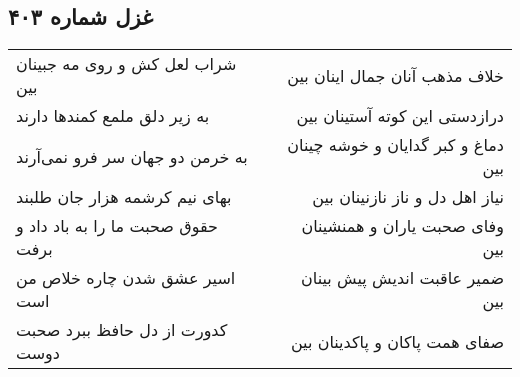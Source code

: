 \begin{center}
\section*{غزل شماره ۴۰۳}
\label{sec:sh403}
\begin{longtable}{l p{0.5cm} r}
شراب لعل کش و روی مه جبینان بین
&&
خلاف مذهب آنان جمال اینان بین
\\
به زیر دلق ملمع کمندها دارند
&&
درازدستی این کوته آستینان بین
\\
به خرمن دو جهان سر فرو نمی‌آرند
&&
دماغ و کبر گدایان و خوشه چینان بین
\\
بهای نیم کرشمه هزار جان طلبند
&&
نیاز اهل دل و ناز نازنینان بین
\\
حقوق صحبت ما را به باد داد و برفت
&&
وفای صحبت یاران و همنشینان بین
\\
اسیر عشق شدن چاره خلاص من است
&&
ضمیر عاقبت اندیش پیش بینان بین
\\
کدورت از دل حافظ ببرد صحبت دوست
&&
صفای همت پاکان و پاکدینان بین
\\
\end{longtable}
\end{center}
